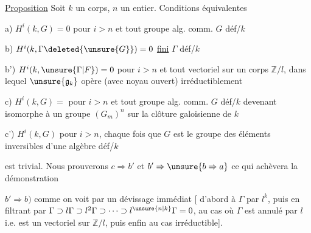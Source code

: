 

\uline{Proposition} Soit $k$ un corps, $n$ un entier. Conditions équivalentes

a) $H^i(k,G)=0$ pour $i>n$ et tout groupe alg. comm. $G$ déf/$k$

b) $H^i(k,\Gamma\deleted{\unsure{G}})=0$ \hfill \uline{fini} $\Gamma$ déf/$k$

 b') $H^i(k,\unsure{\Gamma|F})=0$ pour $i>n$ et tout   vectoriel sur un corps $\mathbb Z/l$, dans lequel $\unsure{\mathfrak g_k}$ opère (avec noyau ouvert) irréductiblement

c) $H^i(k,G)={}$ pour $i>n$ et tout groupe alg. comm. $G$ déf/$k$  devenant isomorphe à un groupe  $(G_m)^n$ sur la clôture galoisienne de $k$

c') $H^i(k,G)$  pour $i>n$, chaque fois que $G$ est le groupe  des éléments inversibles d'une algèbre   déf/$k$

est trivial. Nous prouverons $c\Rightarrow b'$ et $b'\Rightarrow\unsure{b\Rightarrow a}$ ce qui achèvera la démonstration

$b'\Rightarrow b)$  comme on voit par un dévissage immédiat [  d'abord à $\Gamma$   par $l^k$, puis en filtrant par $\Gamma\supset l\Gamma\supset l^2\Gamma\supset\cdots\supset l^{\unsure{n|k}}\Gamma=0$, au cas où $\Gamma$ est annulé par $l$ i.e. est un vectoriel sur $\mathbb Z/l$, puis enfin au cas irréductible].

